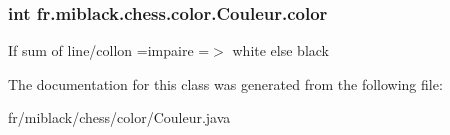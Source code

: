 \subsubsection[{color}]{\setlength{\rightskip}{0pt plus 5cm}int fr.\-miblack.\-chess.\-color.\-Couleur.\-color\hspace{0.3cm}{\ttfamily [protected]}}\label{classfr_1_1miblack_1_1chess_1_1color_1_1Couleur_a51a8fdcfa76057d53b06385515363020}
If sum of line/collon =impaire =$>$ white else black 

The documentation for this class was generated from the following file\-:\begin{DoxyCompactItemize}
\item 
fr/miblack/chess/color/Couleur.\-java\end{DoxyCompactItemize}
